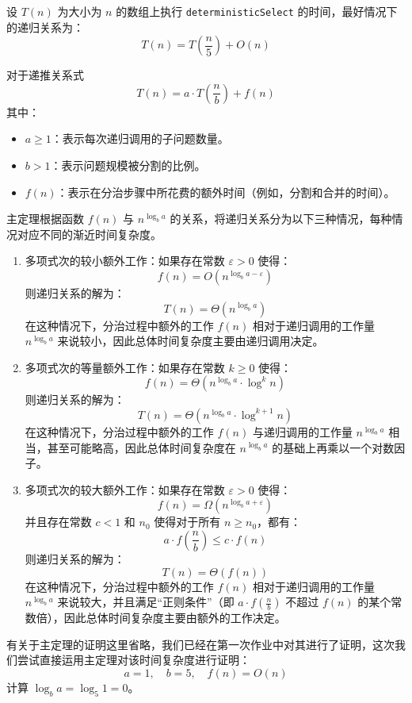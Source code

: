 设 \( T(n) \) 为大小为 \( n \) 的数组上执行 \texttt{deterministicSelect} 的时间，最好情况下的递归关系为：\[
T(n) = T\left(\frac{n}{5}\right) + O(n)
\]
\begin{theorem}
    对于递推关系式\[
T(n) = a \cdot T\left(\frac{n}{b}\right) + f(n)
\]其中：\begin{itemize}
    \item \( a \geq 1 \)：表示每次递归调用的子问题数量。
    \item \( b > 1 \)：表示问题规模被分割的比例。
    \item \( f(n) \)：表示在分治步骤中所花费的额外时间（例如，分割和合并的时间）。
\end{itemize}
主定理根据函数 \( f(n) \) 与 \( n^{\log_b a} \) 的关系，将递归关系分为以下三种情况，每种情况对应不同的渐近时间复杂度。\begin{enumerate}
    \item 多项式次的较小额外工作：如果存在常数 \( \varepsilon > 0 \) 使得：\[
    f(n) = O\left(n^{\log_b a - \varepsilon}\right)
    \]
    则递归关系的解为：\[
    T(n) = \Theta\left(n^{\log_b a}\right)
    \]
    在这种情况下，分治过程中额外的工作 \( f(n) \) 相对于递归调用的工作量 \( n^{\log_b a} \) 来说较小，因此总体时间复杂度主要由递归调用决定。
    \item 多项式次的等量额外工作：如果存在常数 \( k \geq 0 \) 使得：\[
    f(n) = \Theta\left(n^{\log_b a} \cdot \log^k n\right)
    \]
    则递归关系的解为：\[
    T(n) = \Theta\left(n^{\log_b a} \cdot \log^{k+1} n\right)
    \]
    在这种情况下，分治过程中额外的工作 \( f(n) \) 与递归调用的工作量 \( n^{\log_b a} \) 相当，甚至可能略高，因此总体时间复杂度在 \( n^{\log_b a} \) 的基础上再乘以一个对数因子。
    \item 多项式次的较大额外工作：如果存在常数 \( \varepsilon > 0 \) 使得：\[
    f(n) = \Omega\left(n^{\log_b a + \varepsilon}\right)
    \]
    并且存在常数 \( c < 1 \) 和 \( n_0 \) 使得对于所有 \( n \geq n_0 \)，都有：\[
    a \cdot f\left(\frac{n}{b}\right) \leq c \cdot f(n)
    \]
    则递归关系的解为：\[
    T(n) = \Theta\left(f(n)\right)
    \]
    在这种情况下，分治过程中额外的工作 \( f(n) \) 相对于递归调用的工作量 \( n^{\log_b a} \) 来说较大，并且满足“正则条件”（即 \( a \cdot f\left(\frac{n}{b}\right) \) 不超过 \( f(n) \) 的某个常数倍），因此总体时间复杂度主要由额外的工作决定。
\end{enumerate}
\end{theorem}

有关于主定理的证明这里省略，我们已经在第一次作业中对其进行了证明，这次我们尝试直接运用主定理对该时间复杂度进行证明：\[
a = 1, \quad b = 5, \quad f(n) = O(n)
\]
计算 \( \log_b a = \log_5 1 = 0 \)。

